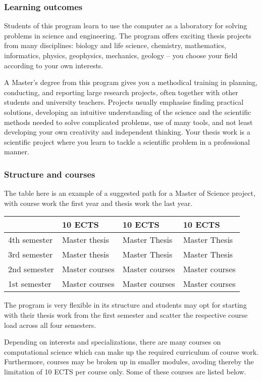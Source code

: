 \documentclass{beamer}
\begin{document}
\begin{frame}
\frametitle{Learning outcomes}

\begin{block}{}
Students of this program learn to use the computer as a laboratory for solving problems in science and engineering. The program offers exciting thesis projects from many disciplines: biology and life science, chemistry, mathematics, informatics, physics, geophysics, mechanics, geology  – you choose your  field according to your own interests.
\end{block}

\begin{block}{}
A Master’s degree from this program gives you a
methodical training in planning, conducting, and reporting large research
projects, often together with other students and university
teachers. Projects usually emphasise finding practical solutions,
developing an intuitive understanding of the science and the
scientific methods needed to solve complicated problems, use of many
tools, and not least developing your own creativity and independent
thinking. Your thesis work is a scientific project where you learn to
tackle a scientific problem in a professional manner.
\end{block}
\end{frame}

\begin{frame}
\frametitle{Structure and courses}

\begin{block}{}
The table here is an example of a suggested path for a Master of Science project,
with course work the first year and thesis work the last year.


{\footnotesize
\begin{tabular}{llll}
\hline
\multicolumn{1}{l}{  } & \multicolumn{1}{l}{ 10 ECTS } & \multicolumn{1}{l}{ 10 ECTS } & \multicolumn{1}{l}{ 10 ECTS } \\
\hline
4th semester & Master thesis  & Master Thesis  & Master Thesis  \\
\hline
3rd semester & Master thesis  & Master Thesis  & Master Thesis  \\
\hline
2nd semester & Master courses & Master courses & Master courses \\
\hline
1st semester & Master courses & Master courses & Master courses \\
\hline
\end{tabular}
}

\noindent
The program is very flexible in its structure and students may opt for starting with their thesis
work from the first semester and scatter the respective course load across all four semesters.

Depending on interests and specializations, there are many courses on computational science which can make
up the required curriculum of course work. Furthermore, courses may be broken up in smaller modules,
avoding thereby the limitation of 10 ECTS per course only. Some of these courses are listed below.
\end{block}
\end{frame}
\end{document}
